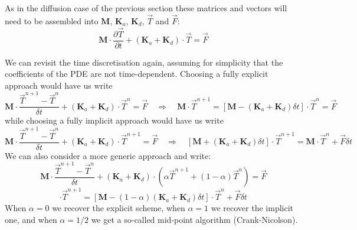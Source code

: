 As in the diffusion case of the previous section these matrices and vectors will need to be 
assembled into ${\bm M}$, ${\bm K}_a$, ${\bm K}_d$, $\vec{T}$ and $\vec{F}$:
\[
{\bm M} \cdot \frac{\partial {\vec T}}{\partial t} + ({\bm K}_a + {\bm K}_d) \cdot {\vec T} = {\vec F}
\]

We can revisit the time discretisation again, assuming for simplicity that the coefficients of the PDE are not time-dependent.
Choosing a fully explicit approach would have us write
\begin{equation}
{\bm M} \cdot \frac{{\vec T}^{n+1}-{\vec T}^n}{\delta t} + ({\bm K}_a + {\bm K}_d) \cdot {\vec T}^{n} = {\vec F}
\quad
\Rightarrow
\quad
{\bm M} \cdot {\vec T}^{n+1} = [{\bm M} - ({\bm K}_a + {\bm K}_d) \delta t] \cdot {\vec T}^{n} = {\vec F}
\end{equation}
while choosing a fully implicit approach would have us write
\begin{equation}
{\bm M} \cdot \frac{{\vec T}^{n+1}-{\vec T}^n}{\delta t} + ({\bm K}_a + {\bm K}_d) \cdot {\vec T}^{n+1} = {\vec F}
\quad
\Rightarrow
\quad
[{\bm M} +  ({\bm K}_a + {\bm K}_d) \delta t] \cdot {\vec T}^{n+1}
={\bm M}\cdot {\vec T}^n+ {\vec F} \delta t
\end{equation}
We can also consider a more generic approach and write:
\begin{equation}
{\bm M} \cdot \frac{{\vec T}^{n+1}-{\vec T}^n}{\delta t} + ({\bm K}_a + {\bm K}_d) \cdot (\alpha {\vec T}^{n+1}+(1-\alpha)\vec{T}^{n}) = {\vec F}
\end{equation}
\begin{equation}
[{\bm M} +  \alpha({\bm K}_a + {\bm K}_d) \delta t] \cdot {\vec T}^{n+1}
=
[{\bm M} - (1-\alpha)({\bm K}_a + {\bm K}_d) \delta t] \cdot {\vec T}^{n} + {\vec F}\delta t
\end{equation}
When $\alpha=0$ we recover the explicit scheme, when $\alpha=1$ we recover 
the implicit one, and when $\alpha=1/2$ we get a so-called 
mid-point algorithm (Crank-Nicolson).


